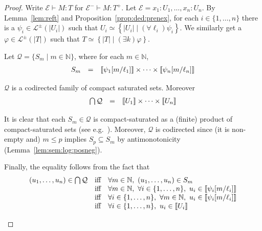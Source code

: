 \documentclass[%
  a4paper,
  UKenglish,
  cleveref,
  autoref,
  thm-restate,
  numberwithinsect,
]{lipics-v2021}
\newcommand\sle\subseteq
\newcommand\thesis{\vdash}
\newcommand\NN{\mathbb{N}}
\newcommand\I[1]{\llbracket #1 \rrbracket} %
\newcommand\Env{\mathcal{E}}    %
\newcommand\eqtype\simeq
\newcommand\reft[1]{\left\{ #1 \right\}}
\newcommand\RT{T}               %
\newcommand\RTbis{U}            %
\newcommand\UPT[1]{\vert #1 \vert}        %
\newcommand\itvar{k}
\newcommand\itvarbis{\ell}
\newcommand\Lang{\mathcal{L}}
\begin{document}
\begin{proof}
Write $\Env \thesis M \colon \RT$ for $\Env^- \thesis M \colon \RT^+$.
Let $\Env = x_1\colon \RTbis_1,\dots,x_n \colon \RTbis_n$.
By Lemma~\ref{lem:reft} and
Proposition~\ref{prop:ded:prenex},
for each $i \in \{1,\dots,n\}$
there is a $\psi_i \in \Lang^\pm(\UPT{\RTbis_i})$
such that $\RTbis_i \eqtype \reft{\UPT{\RTbis_i} \mid (\forall \itvarbis_i)\psi_i}$.
%
We similarly get a $\varphi \in \Lang^\pm(\UPT\RT)$
such that $\RT \eqtype \reft{\UPT\RT \mid (\exists \itvar)\varphi}$.

Let $\mathcal{Q} = \{S_m \mid m \in \NN\}$,
where for each $m \in \NN$,
\[
\begin{array}{l l l}
  S_m
& =
& \I{\psi_1[m / \itvarbis_1]}
  \times
  \dots
  \times
  \I{\psi_n[m / \itvarbis_n]}
\end{array}
\]


\begin{claim}
$\mathcal{Q}$ is a codirected family of compact saturated sets.
Moreover
\[
\begin{array}{l l l}
  \bigcap \mathcal{Q}
& =
& \I{\RTbis_1}
  \times \dots \times
  \I{\RTbis_n}
\end{array}
\]
\end{claim}

\begin{claimproof}
It is clear that each $S_m \in \mathcal{Q}$
is compact-saturated as a (finite) product of compact-saturated sets
(see e.g.~\cite[Theorem 4.5.12]{goubault13book}).
Moreover, $\mathcal{Q}$ is codirected since (it is non-empty and)
$m \leq p$ implies
$S_p \sle S_m$ by antimonotonicity
(Lemma~\ref{lem:sem:log:posneg}).

Finally, the equality follows from the fact that
\[
\begin{array}{l l l}
  (u_1,\dots,u_n) \in \bigcap \mathcal{Q}
& \text{iff}
& \forall m \in \NN,~ (u_1,\dots,u_n) \in S_m
\\
%
& \text{iff}
& \forall m \in \NN,~
  \forall i \in \{1,\dots,n\},~
  u_i \in \I{\psi_i[m / \itvarbis_i]}
\\
%
& \text{iff}
& \forall i \in \{1,\dots,n\},~
  \forall m \in \NN,~
  u_i \in \I{\psi_i[m / \itvarbis_i]}
\\
%
& \text{iff}
& \forall i \in \{1,\dots,n\},~
  u_i \in \I{\RTbis_i}
\end{array}
\]
\end{claimproof}


\end{proof}
\end{document}
